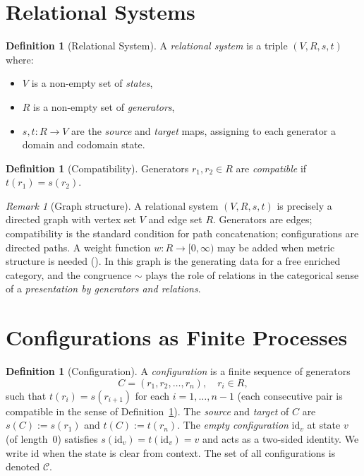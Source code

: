 \documentclass{article}
\theoremstyle{definition}
\newtheorem{definition}[theorem]{Definition}
\theoremstyle{remark}
\newtheorem{remark}[theorem]{Remark}
\newcommand{\RC}{\mathcal{C}}
\newcommand{\id}{\mathrm{id}}
\begin{document}
\section{Relational Systems}
\label{sec:relational}

\begin{definition}[Relational System]
\label{def:relsystem}
A \emph{relational system} is a triple $(V, R, s, t)$ where:
\begin{itemize}
  \item $V$ is a non-empty set of \emph{states},
  \item $R$ is a non-empty set of \emph{generators},
  \item $s, t : R \to V$ are the \emph{source} and \emph{target}
        maps, assigning to each generator a domain and codomain
        state.
\end{itemize}
\end{definition}

\begin{definition}[Compatibility]
\label{def:compat}
Generators $r_1, r_2 \in R$ are \emph{compatible} if
$t(r_1) = s(r_2)$.
\end{definition}

\begin{remark}[Graph structure]
\label{rem:graph}
A relational system $(V, R, s, t)$ is precisely a directed graph
with vertex set $V$ and edge set $R$. Generators are edges;
compatibility is the standard condition for path concatenation;
configurations are directed paths. A weight function
$w : R \to [0,\infty)$ may be added when metric structure is
needed (). In  this graph
is the generating data for a free enriched category, and the
congruence $\sim$ plays the role of relations in the categorical
sense of a \emph{presentation by generators and relations}.
\end{remark}

\section{Configurations as Finite Processes}
\label{sec:configurations}

\begin{definition}[Configuration]
\label{def:configuration}
A \emph{configuration} is a finite sequence of generators
\[
  C = (r_1, r_2, \dots, r_n), \quad r_i \in R,
\]
such that $t(r_i) = s(r_{i+1})$ for each $i = 1, \dots, n-1$
(each consecutive pair is compatible in the sense of
Definition~\ref{def:compat}). The \emph{source} and
\emph{target} of $C$ are $s(C) := s(r_1)$ and $t(C) := t(r_n)$.
The \emph{empty configuration} $\id_v$ at state $v$ (of
length~$0$) satisfies $s(\id_v) = t(\id_v) = v$ and acts as
a two-sided identity. We write $\id$ when the state is clear
from context. The set of all configurations is denoted $\RC$.
\end{definition}
\end{document}
